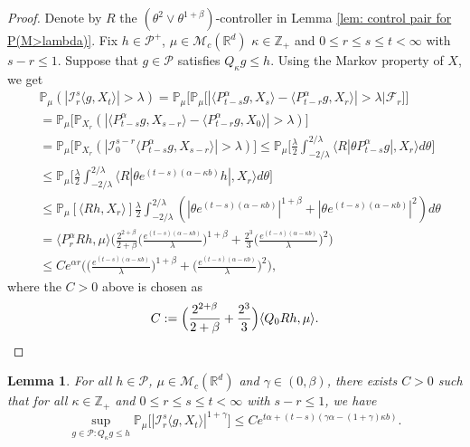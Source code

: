 \documentclass[12pt,a4paper]{amsart}
\theoremstyle{plain}
\newtheorem{lem}[thm]{Lemma}
\theoremstyle{definition}
\numberwithin{equation}{section}
\begin{document}
\begin{proof}
    Denote by $R$ the $(\theta^2\vee\theta^{1+\beta})$-controller in Lemma \ref{lem: control pair for P(M>lambda)}.
    Fix $h \in \mathcal P^+$, $\mu \in \mathcal M_c(\mathbb R^d)$ $\kappa \in \mathbb Z_+ $ and $0\leq r\leq s\leq t < \infty$ with $s-r \leq 1$.
    Suppose that $g\in \mathcal P$ satisfies $Q_\kappa g \leq h$.
    Using the Markov property of $X$, we get
\begin{align}
    &\mathbb P_{\mu}(|\mathcal I_r^s\langle g, X_t\rangle|>\lambda)
    = \mathbb P_\mu \Big[\mathbb P_\mu\big[|\langle P_{t-s}^\alpha g, X_{s}\rangle - \langle P_{t-r}^\alpha g, X_{r}\rangle|> \lambda\big| \mathscr F_r\big]\Big]
    \\&= \mathbb P_\mu \big[\mathbb P_{X_r}(|\langle P_{t-s}^\alpha g, X_{s-r}\rangle - \langle P_{t-r}^\alpha g, X_{0}\rangle|> \lambda)\big]
    \\&= \mathbb P_\mu \big[\mathbb P_{X_r}(|\mathcal I_0^{s-r}\langle P_{t-s}^\alpha g, X_{s-r}\rangle |> \lambda)\big]
    \leq \mathbb P_\mu \Big[ \frac{\lambda}{2}\int_{-2/\lambda}^{2/\lambda}\langle R|\theta P^\alpha_{t-s}g|,X_r\rangle d\theta \Big]
    \\&\leq \mathbb P_\mu \Big[ \frac{\lambda}{2}\int_{-2/\lambda}^{2/\lambda}\langle R|\theta e^{(t-s)(\alpha- \kappa b)}h|,X_r\rangle d\theta \Big]
    \\&\leq \mathbb P_\mu [ \langle Rh,X_r\rangle ] \frac{\lambda}{2}\int_{-2/\lambda}^{2/\lambda}(|\theta e^{(t-s)(\alpha- \kappa b)}|^{1+\beta} + |\theta e^{(t-s)(\alpha- \kappa b)}|^{2})d\theta
    \\& =  \langle P_r^\alpha Rh,\mu\rangle \bigg(  \frac{2^{2+\beta}}{2+\beta}\Big(\frac{e^{(t-s)(\alpha- \kappa b)}}{\lambda}\Big)^{1+\beta} + \frac{2^{3}}{3}\Big(\frac{e^{(t-s)(\alpha- \kappa b)}}{\lambda}\Big)^2\bigg)
    \\ & \leq C e^{\alpha r} \bigg(\Big( \frac{e^{(t-s)(\alpha - \kappa b)}}{\lambda}\Big)^{1+\beta} + \Big( \frac{e^{(t-s)(\alpha - \kappa b)}}{\lambda}\Big)^{2} \bigg),
\end{align}
    where the $C>0$ above is chosen as
\[
    C := \Big(\frac{2^{2+\beta}}{2+\beta} + \frac{2^{3}}{3} \Big)\langle Q_0Rh, \mu\rangle.
    \qedhere
\]
\end{proof}

\begin{lem}
\label{lem: control of mgtrs}
    For all $h \in \mathcal P$, $\mu \in \mathcal M_c(\mathbb R^d)$ and $\gamma\in (0, \beta)$, there exists $C > 0$ such that for all $\kappa \in \mathbb Z_+$ and $0\leq r\leq s\leq t<\infty$ with $s-r \leq 1$, we have
\[
    \sup_{g \in \mathcal P: Q_\kappa g\leq h} \mathbb P_\mu\big[|\mathcal I_r^s\langle g, X_t\rangle|^{1+\gamma}\big]
    \leq C e^{t\alpha+(t-s) (\gamma\alpha- (1+\gamma)\kappa b)}.
\]
\end{lem}
\end{document}
